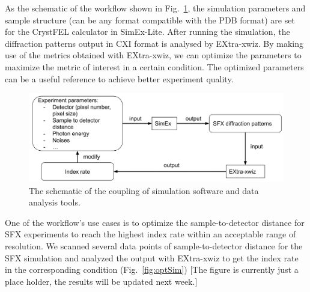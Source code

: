 \documentclass[11pt, a4paper]{article}
\begin{document}
As the schematic of the workflow shown in Fig.~\ref{fig:feedbackloop}, the simulation parameters and sample structure (can be any format compatible with the PDB format) are set for the CrystFEL calculator in SimEx-Lite. After running the simulation, the diffraction patterns output in CXI format is analysed by EXtra-xwiz. By making use of the metrics obtained with EXtra-xwiz, we can optimize the parameters to maximize the metric of interest in a certain condition. The optimized parameters can be a useful reference to achieve better experiment quality.

\begin{figure}[h!!!]
    \centering
    \includegraphics[width=0.75\columnwidth]{figures/feedbackloop.png}
    \caption{The schematic of the coupling of simulation software and data analysis tools.}
    \label{fig:feedbackloop}
\end{figure}

One of the workflow's use cases is to optimize the sample-to-detector distance for SFX experiments to reach the highest index rate within an acceptable range of resolution. We scanned several data points of sample-to-detector distance for the SFX simulation and analyzed the output with EXtra-xwiz to get the index rate in the corresponding condition (Fig.~\ref{fig:optSim}) {\color{blue}[The figure is currently just a place holder, the results will be updated next week.]} 
\end{document}

